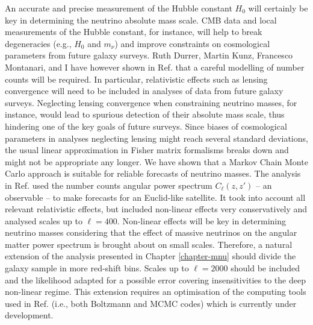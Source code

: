 An accurate and precise measurement of the Hubble constant $H_0$ will certainly be key in determining the neutrino absolute mass scale. CMB data and local measurements of the Hubble constant, for instance, will help to break degeneracies (e.g., $H_0$ and $m_\nu$) and improve constraints on cosmological parameters from future galaxy surveys.  Ruth Durrer, Martin Kunz, Francesco Montanari, and I have however shown in Ref. \cite{Cardona:2016qxn} that a careful modelling of number counts will be required. In particular, relativistic effects such as lensing convergence will need to be included in analyses of data from future galaxy surveys. Neglecting lensing convergence when constraining neutrino masses, for instance, would lead to spurious detection of their absolute mass scale, thus hindering one of the key goals of future surveys. Since biases of cosmological parameters in analyses neglecting lensing might reach several standard deviations, the usual linear approximation in Fisher matrix formalisms breaks down and might not be appropriate any longer. We have shown that a Markov Chain Monte Carlo approach is suitable for reliable forecasts of neutrino masses. The analysis in Ref. \cite{Cardona:2016qxn} used the number counts angular power spectrum $C_\ell(z,z')$ -- an observable -- to make forecasts for an Euclid-like satellite. It took into account all relevant relativistic effects, but included non-linear effects very conservatively and analysed scales up to $\ell=400$. Non-linear effects will be key in determining neutrino masses considering that the effect of massive neutrinos on the angular matter power spectrum is brought about on small scales. Therefore, a natural extension of the analysis presented in Chapter \ref{chapter-mnu} should divide the galaxy sample in more red-shift bins. Scales up to $\ell=2000$ should be included and the likelihood adapted for a possible error covering insensitivities to the deep non-linear regime.
This extension requires an optimisation of the computing tools used in Ref. \cite{Cardona:2016qxn} (i.e., both Boltzmann and MCMC codes) which is currently under development.   

